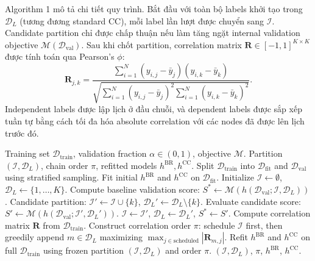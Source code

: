 \documentclass[conference]{IEEEtran}
\begin{document}
Algorithm 1 mô tả chi tiết quy trình. Bắt đầu với toàn bộ labels khởi tạo trong $\mathcal{D}_L$ (tương đương standard CC), mỗi label lần lượt được chuyển sang $\mathcal{I}$. Candidate partition chỉ được chấp thuận nếu làm tăng ngặt internal validation objective $\mathcal{M}(\mathcal{D}_{\text{val}})$. Sau khi chốt partition, correlation matrix $\mathbf{R} \in [-1, 1]^{K \times K}$ được tính toán qua Pearson's $\phi$:
\begin{equation}
    \mathbf{R}_{j, k} = \frac{\sum_{i=1}^N (y_{i,j} - \bar{y}_j)(y_{i,k} - \bar{y}_k)}{\sqrt{\sum_{i=1}^N (y_{i,j} - \bar{y}_j)^2 \sum_{i=1}^N (y_{i,k} - \bar{y}_k)^2}}.
\end{equation}
Independent labels được lập lịch ở đầu chuỗi, và dependent labels được sắp xếp tuần tự bằng cách tối đa hóa absolute correlation với các nodes đã được lên lịch trước đó.

\begin{algorithm}[htbp]
\caption{Greedy Selection of Independent Labels (GSI)}
\begin{algorithmic}[1]
\REQUIRE Training set $\mathcal{D}_{\text{train}}$, validation fraction $\alpha \in (0, 1)$, objective $\mathcal{M}$.
\ENSURE Partition $(\mathcal{I}, \mathcal{D}_L)$, chain order $\pi$, refitted models $h^{\text{BR}}, h^{\text{CC}}$.
\STATE Split $\mathcal{D}_{\text{train}}$ into $\mathcal{D}_{\text{fit}}$ and $\mathcal{D}_{\text{val}}$ using stratified sampling.
\STATE Fit initial $h^{\text{BR}}$ and $h^{\text{CC}}$ on $\mathcal{D}_{\text{fit}}$.
\STATE Initialize $\mathcal{I} \leftarrow \emptyset$, $\mathcal{D}_L \leftarrow \{1, \dots, K\}$.
\STATE Compute baseline validation score: $S^* \leftarrow \mathcal{M}(h(\mathcal{D}_{\text{val}}; \mathcal{I}, \mathcal{D}_L))$.
    \STATE Candidate partition: $\mathcal{I}' \leftarrow \mathcal{I} \cup \{k\}$, $\mathcal{D}_L' \leftarrow \mathcal{D}_L \setminus \{k\}$.
    \STATE Evaluate candidate score: $S' \leftarrow \mathcal{M}(h(\mathcal{D}_{\text{val}}; \mathcal{I}', \mathcal{D}_L'))$.
        \STATE $\mathcal{I} \leftarrow \mathcal{I}'$, $\mathcal{D}_L \leftarrow \mathcal{D}_L'$, $S^* \leftarrow S'$.
    \ENDIF
\ENDFOR
\STATE Compute correlation matrix $\mathbf{R}$ from $\mathcal{D}_{\text{train}}$.
\STATE Construct correlation order $\pi$: schedule $\mathcal{I}$ first, then greedily append $m \in \mathcal{D}_L$ maximizing $\max_{j \in \text{scheduled}} |\mathbf{R}_{m, j}|$.
\STATE Refit $h^{\text{BR}}$ and $h^{\text{CC}}$ on full $\mathcal{D}_{\text{train}}$ using frozen partition $(\mathcal{I}, \mathcal{D}_L)$ and order $\pi$.
\RETURN $(\mathcal{I}, \mathcal{D}_L)$, $\pi$, $h^{\text{BR}}$, $h^{\text{CC}}$.
\end{algorithmic}
\end{algorithm}
\end{document}
